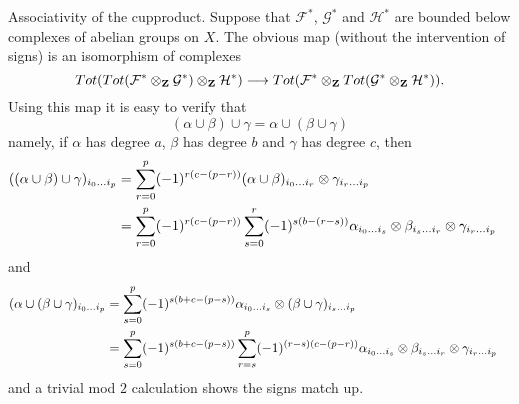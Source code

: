 \medskip\noindent
Associativity of the cupproduct. Suppose that ${\mathcal F}^*$,
${\mathcal G}^*$ and ${\mathcal H}^*$ are bounded below
complexes of abelian groups on $X$. The obvious map
(without the intervention of signs) is an isomorphism
of complexes
$$
Tot(Tot({\mathcal F}^*\otimes_{\bf Z} {\mathcal G}^*)\otimes_{\bf Z} {\mathcal H}^*)
\longrightarrow
Tot({\mathcal F}^*\otimes_{\bf Z} Tot({\mathcal G}^*\otimes_{\bf Z} {\mathcal H}^*)).
$$
Using this map it is easy to verify that
$$
(\alpha \cup \beta) \cup \gamma = \alpha \cup ( \beta \cup \gamma)
$$
namely, if $\alpha$ has degree $a$, $\beta$ has degree $b$ and
$\gamma$ has degree $c$, then
\begin{align}
((\alpha \cup \beta) \cup \gamma)_{i_0\ldots i_p}
& =
\sum_{r=0}^p
(-1)^{r(c-(p-r))}
(\alpha\cup\beta)_{i_0\ldots i_r} \otimes \gamma_{i_r\ldots i_p}
\cr
& =
\sum_{r=0}^p
(-1)^{r(c-(p-r))}
\sum_{s=0}^r
(-1)^{s(b-(r-s))}
\alpha_{i_0\ldots i_s} \otimes \beta_{i_s\ldots i_r} \otimes \gamma_{i_r\ldots i_p}
\end{align}
and
\begin{align}
(\alpha \cup (\beta \cup \gamma)_{i_0\ldots i_p}
& =
\sum_{s=0}^p
(-1)^{s(b+c-(p-s))}
\alpha_{i_0\ldots i_s} \otimes (\beta \cup \gamma)_{i_s\ldots i_p}
\cr
& =
\sum_{s=0}^p
(-1)^{s(b+c-(p-s))}
\sum_{r=s}^p
(-1)^{(r-s)(c-(p-r))}
\alpha_{i_0\ldots i_s} \otimes \beta_{i_s\ldots i_r} \otimes \gamma_{i_r\ldots i_p}
\end{align}
and a trivial mod $2$ calculation shows the signs match up.

